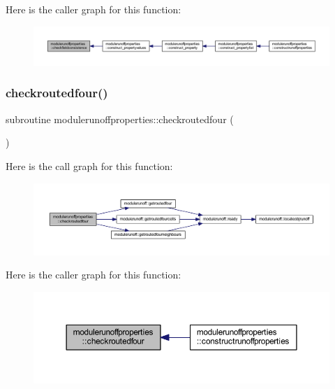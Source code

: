 Here is the caller graph for this function\+:\nopagebreak
\begin{figure}[H]
\begin{center}
\leavevmode
\includegraphics[width=350pt]{namespacemodulerunoffproperties_a06845b65870b1cb0e5333b9ef618d43d_icgraph}
\end{center}
\end{figure}
\mbox{\label{namespacemodulerunoffproperties_aabfeca3506901fe0c3708f17a7affbbd}} 
\subsubsection{\texorpdfstring{checkroutedfour()}{checkroutedfour()}}
{\footnotesize\ttfamily subroutine modulerunoffproperties\+::checkroutedfour (\begin{DoxyParamCaption}{ }\end{DoxyParamCaption})\hspace{0.3cm}{\ttfamily [private]}}

Here is the call graph for this function\+:\nopagebreak
\begin{figure}[H]
\begin{center}
\leavevmode
\includegraphics[width=350pt]{namespacemodulerunoffproperties_aabfeca3506901fe0c3708f17a7affbbd_cgraph}
\end{center}
\end{figure}
Here is the caller graph for this function\+:\nopagebreak
\begin{figure}[H]
\begin{center}
\leavevmode
\includegraphics[width=350pt]{namespacemodulerunoffproperties_aabfeca3506901fe0c3708f17a7affbbd_icgraph}
\end{center}
\end{figure}
\mbox{\label{namespacemodulerunoffproperties_a2c0e22dfe3b09a4715eaf763f273241b}} 
